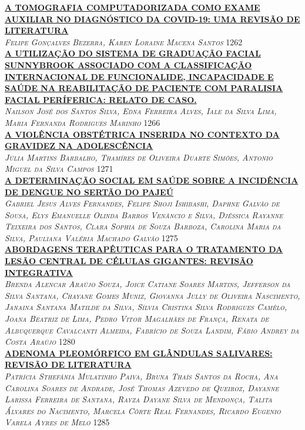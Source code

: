 \noindent \textsc{\hyperlink{trabalhos/250703.pdf.1}{\textbf{A TOMOGRAFIA COMPUTADORIZADA COMO EXAME AUXILIAR NO DIAGNÓSTICO DA COVID-19: UMA REVISÃO DE LITERATURA}}}\\ 
\noindent \textsc{\textit{Felipe Gonçalves Bezerra, Karen Loraine Macena Santos}} \hfill 1262\\ 

\noindent \textsc{\hyperlink{trabalhos/251847.pdf.1}{\textbf{A UTILIZAÇÃO DO SISTEMA DE GRADUAÇÃO FACIAL SUNNYBROOK ASSOCIADO COM A CLASSIFICAÇÃO INTERNACIONAL DE FUNCIONALIDE, INCAPACIDADE E SAÚDE NA REABILITAÇÃO DE PACIENTE COM PARALISIA FACIAL PERÍFERICA: RELATO DE CASO.}}}\\ 
\noindent \textsc{\textit{Nailson José dos Santos Silva, Edna Ferreira Alves, Iale da Silva Lima, Maria Fernanda Rodrigues Marinho}} \hfill 1266\\ 

\noindent \textsc{\hyperlink{trabalhos/251639.pdf.1}{\textbf{A VIOLÊNCIA OBSTÉTRICA INSERIDA NO CONTEXTO DA GRAVIDEZ NA ADOLESCÊNCIA}}}\\ 
\noindent \textsc{\textit{Júlia Martins Barbalho, Thamíres de Oliveira Duarte Simões, Antonio Miguel da Silva Campos}} \hfill 1271\\ 

\noindent \textsc{\hyperlink{trabalhos/250529.pdf.1}{\textbf{A DETERMINAÇÃO SOCIAL EM SAÚDE SOBRE A INCIDÊNCIA DE DENGUE NO SERTÃO DO PAJEÚ}}}\\ 
\noindent \textsc{\textit{Gabriel Jesus Alves Fernandes, Felipe Shoji Ishibashi, Daphne Galvão de Sousa, Elys Emanuelle Olinda Barros Venâncio e Silva, Djéssica Rayanne Teixeira dos Santos, Clara Sophia de Souza Barboza, Carolina Maria da Silva, Pauliana Valéria Machado Galvão}} \hfill 1275\\ 

\noindent \textsc{\hyperlink{trabalhos/250095.pdf.1}{\textbf{ABORDAGENS TERAPÊUTICAS PARA O TRATAMENTO DA LESÃO CENTRAL DE CÉLULAS GIGANTES: REVISÃO INTEGRATIVA}}}\\ 
\noindent \textsc{\textit{Brenda Alencar Araújo Souza, Joice Catiane Soares Martins, Jefferson da Silva Santana, Chayane Gomes Muniz, Giovanna Jully de Oliveira Nascimento, Janaina Santana Matilde da Silva, Sílvia Cristina Silva Rodrigues Camêlo, Joana Beatriz de Lima, Pedro Vitor Magalhães de França, Renata de Albuquerque Cavalcanti Almeida, Fabrício de Souza Landim, Fábio Andrey da Costa Araújo}} \hfill 1280\\ 

\noindent \textsc{\hyperlink{trabalhos/249903.pdf.1}{\textbf{ADENOMA PLEOMÓRFICO EM GLÂNDULAS SALIVARES: REVISÃO DE LITERATURA}}}\\ 
\noindent \textsc{\textit{Patrícia Sthefânia Mulatinho Paiva, Bruna Thaís Santos da Rocha, Ana Carolina Soares de Andrade, José Thomas Azevedo de Queiroz, Dayanne Larissa Ferreira de Santana, Rayza Dayane Silva de Mendonça, Talita Álvares do Nacimento, Marcela Côrte Real Fernandes, Ricardo Eugenio Varela Ayres de Melo}} \hfill 1285\\ 

